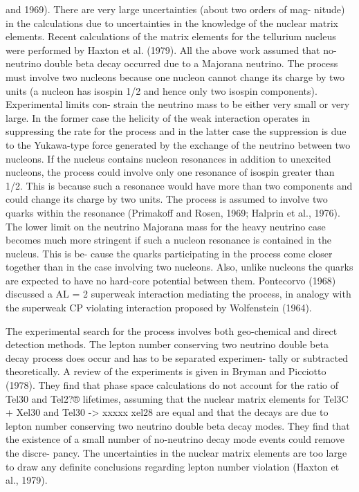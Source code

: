 \documentclass[twoside]{article}
\begin{document}
{{{{{{{{{{{{{{and 1969). There are very large uncertainties (about two orders of mag-
nitude) in the calculations due to uncertainties in the knowledge of
the nuclear matrix elements. Recent calculations of the matrix elements
for the tellurium nucleus were performed by Haxton et al. (1979). All
the above work assumed that no-neutrino double beta decay occurred due
to a Majorana neutrino. The process must involve two nucleons because
one nucleon cannot change its charge by two units (a nucleon has isospin
1/2 and hence only two isospin components). Experimental limits con-
strain the neutrino mass to be either very small or very large. In the
former case the helicity of the weak interaction operates in suppressing
the rate for the process and in the latter case the suppression is due to
the Yukawa-type force generated by the exchange of the neutrino between
two nucleons. If the nucleus contains nucleon resonances in addition
to unexcited nucleons, the process could involve only one resonance of
isospin greater than 1/2. This is because such a resonance would have
more than two components and could change its charge by two units. The
process is assumed to involve two quarks within the resonance (Primakoff
and Rosen, 1969; Halprin et al., 1976). The lower limit on the neutrino
Majorana mass for the heavy neutrino case becomes much more stringent
if such a nucleon resonance is contained in the nucleus. This is be-
cause the quarks participating in the process come closer together than
in the case involving two nucleons. Also, unlike nucleons the quarks
are expected to have no hard-core potential between them. Pontecorvo
(1968) discussed a AL = 2 superweak interaction mediating the process,
in analogy with the superweak CP violating interaction proposed by
Wolfenstein (1964).

The experimental search for the process involves both geo-chemical
and direct detection methods. The lepton number conserving two neutrino
double beta decay process does occur and has to be separated experimen-
tally or subtracted theoretically. A review of the experiments is given
in Bryman and Picciotto (1978). They find that phase space calculations
do not account for the ratio of Tel30 and Tel2?® lifetimes, assuming
that the nuclear matrix elements for Tel3C + Xel30 and Tel30  -> xxxxx xel28
are equal and that the decays are due to lepton number conserving two
neutrino double beta decay modes. They find that the existence of a
small number of no-neutrino decay mode events could remove the discre-
pancy. The uncertainties in the nuclear matrix elements are too large
to draw any definite conclusions regarding lepton number violation
(Haxton et al., 1979).


}}}}}}}}}}}}}}
\end{document}
